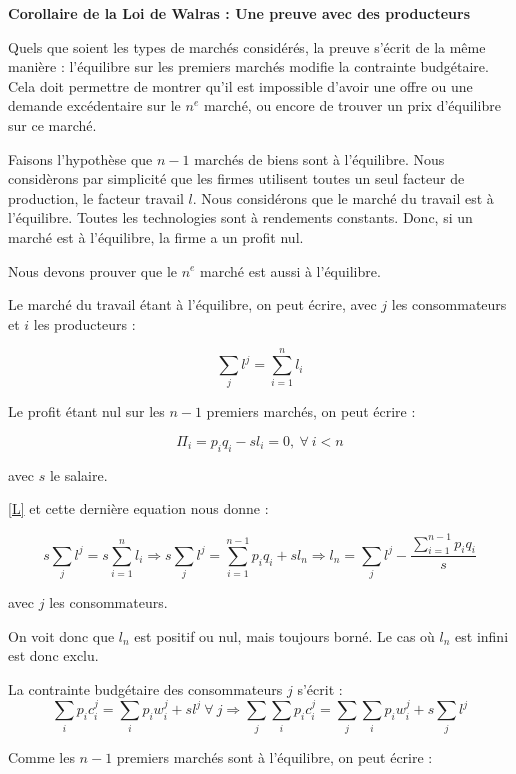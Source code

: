 \documentclass[11pt]{article}
\begin{document}
\textbf{Corollaire de la Loi de Walras : Une preuve avec des producteurs}

Quels que soient les types de marchés considérés, la preuve s'écrit de la même manière : l'équilibre sur les premiers marchés modifie la contrainte budgétaire. Cela doit permettre de montrer qu'il est impossible d'avoir une offre ou une demande excédentaire sur le $n^e$ marché, ou encore de trouver un prix d'équilibre sur ce marché.
 
Faisons l'hypothèse que $n-1$ marchés de biens sont à l'équilibre. Nous considèrons par simplicité que les firmes utilisent toutes un seul facteur de production, le facteur travail $l$. Nous considérons que le marché du travail est à l'équilibre. Toutes les technologies sont à rendements constants. Donc, si un marché est à l'équilibre, la firme a un profit nul. 

Nous devons prouver que le $n^{e}$ marché est aussi à l'équilibre.

Le marché du travail étant à l'équilibre, on peut écrire, avec $j$ les consommateurs et $ i $ les producteurs :

\begin{equation}\tag{L} \label{L}
\sum_{j} l^j = \sum_{i=1}^{n} l_{i}
\end{equation}



Le profit étant nul sur les $n-1$ premiers marchés, on peut écrire : 

$$ \Pi_i = p_i q_i - s l_i = 0, \ \forall \ i < n $$

avec $s$ le salaire.

\ref{L} et cette dernière equation nous donne :

$$ s\sum_{j} l^j = s \sum_{i=1}^{n} l_{i} \Rightarrow s\sum_{j} l^j = \sum_{i=1}^{n-1} p_i q_{i} + s l_n  \Rightarrow  l_n =  \sum_{j} l^j - \frac{\sum_{i=1}^{n-1} p_i q_{i}}{s}  $$
 
 avec $j$ les consommateurs.
 
 On voit donc que $l_n$ est positif ou nul, mais toujours borné. Le cas où $l_n$ est infini est donc exclu.
 
 La contrainte budgétaire des consommateurs $j$ s'écrit :
 \begin{equation}\tag{CB} \label{CB}
 \sum_i p_i c_i^j = \sum_i p_i w_i^j + s l^j \ \forall \ j \Rightarrow \sum_j \sum_i p_i c_i^j = \sum_j \sum_i p_i w_i^j + s \sum_j l^j
\end{equation}  
 
 Comme les $n-1$ premiers marchés sont à l'équilibre, on peut écrire : 
 
\end{document}
